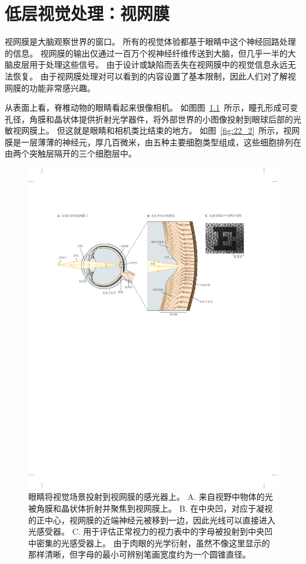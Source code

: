 \chapter{低层视觉处理：视网膜} \label{chap:chap22}

视网膜是大脑观察世界的窗口。
所有的视觉体验都基于眼睛中这个神经回路处理的信息。 
视网膜的输出仅通过一百万个视神经纤维传送到大脑，但几乎一半的大脑皮层用于处理这些信号。
由于设计或缺陷而丢失在视网膜中的视觉信息永远无法恢复。
由于视网膜处理对可以看到的内容设置了基本限制，因此人们对了解视网膜的功能非常感兴趣。


从表面上看，脊椎动物的眼睛看起来很像相机。
如图图~\ref{fig:22_1}~所示，瞳孔形成可变孔径，角膜和晶状体提供折射光学器件，将外部世界的小图像投射到眼球后部的光敏视网膜上。
但这就是眼睛和相机类比结束的地方。
如图~\ref{fig:22_2}~所示，视网膜是一层薄薄的神经元，厚几百微米，由五种主要细胞类型组成，这些细胞排列在由两个突触层隔开的三个细胞层中。


\begin{figure}[htbp]
	\centering
	\includegraphics[width=1.0\linewidth]{chap22/fig_22_1}
	\caption{眼睛将视觉场景投射到视网膜的感光器上。
		A. 来自视野中物体的光被角膜和晶状体折射并聚焦到视网膜上。
		B. 在中央凹，对应于凝视的正中心，视网膜的近端神经元被移到一边，因此光线可以直接进入光感受器。
		C. 用于评估正常视力的视力表中的字母被投射到中央凹中密集的光感受器上。
		由于肉眼的光学衍射，虽然不像这里显示的那样清晰，但字母的最小可辨别笔画宽度约为一个圆锥直径\cite{curcio1991organization}。}
	\label{fig:22_1}
\end{figure}


